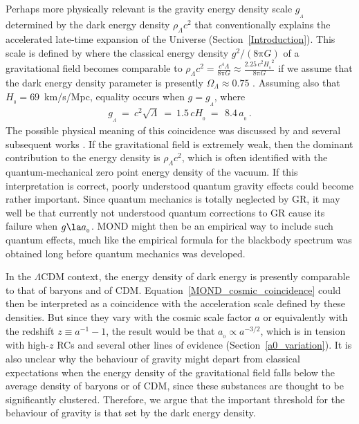 \documentclass[fleqn,usenatbib,useAMS]{mnras} %
\begin{document}
Perhaps more physically relevant is the gravity energy density scale $g_{_\Lambda}$ determined by the dark energy density $\rho_{\Lambda} c^2$ that conventionally explains the accelerated late-time expansion of the Universe (Section~\ref{Introduction}). This scale is defined by where the classical energy density $g^2/\left(8 \mathrm{\pi} G \right)$ of a gravitational field \citep[equation~9 of][]{Peters_1981} becomes comparable to $\rho_{\Lambda} c^2 = \frac{c^4 \Lambda}{8 \mathrm{\pi} G} \approx \frac{2.25 \, c^2 {H_{_0}}^2}{8 \mathrm{\pi} G}$ if we assume that the dark energy density parameter is presently $\Omega_\Lambda \approx 0.75$ \citep{Planck_2016, Planck_2020}. Assuming also that $H_{_0} = 69$~km/s/Mpc, equality occurs when $g = g_{_\Lambda}$, where
\begin{eqnarray}
	g_{_\Lambda} ~=~ c^2 \sqrt{\Lambda} ~=~ 1.5 \, cH_{_0} ~=~ \, 8.4 \, a_{_0} \, .
	\label{MOND_cosmic_coincidence}
\end{eqnarray}
The possible physical meaning of this coincidence was discussed by \citet{Milgrom_1999} and several subsequent works \citep[e.g.][]{Pazy_2013, Verlinde_2017, Smolin_2017}. If the gravitational field is extremely weak, then the dominant contribution to the energy density is $\rho_{\Lambda}c^2$, which is often identified with the quantum-mechanical zero point energy density of the vacuum. If this interpretation is correct, poorly understood quantum gravity effects could become rather important. Since quantum mechanics is totally neglected by GR, it may well be that currently not understood quantum corrections to GR cause its failure when $g \la a_{_0}$. MOND might then be an empirical way to include such quantum effects, much like the empirical formula for the blackbody spectrum was obtained long before quantum mechanics was developed.

In the $\Lambda$CDM context, the energy density of dark energy is presently comparable to that of baryons and of CDM. Equation~\ref{MOND_cosmic_coincidence} could then be interpreted as a coincidence with the acceleration scale defined by these densities. But since they vary with the cosmic scale factor $a$ or equivalently with the redshift $z \equiv a^{-1} - 1$, the result would be that $a_{_0} \propto a^{-3/2}$, which is in tension with high-$z$ RCs \citep{Milgrom_2017} and several other lines of evidence (Section~\ref{a0_variation}). It is also unclear why the behaviour of gravity might depart from classical expectations when the energy density of the gravitational field falls below the average density of baryons or of CDM, since these substances are thought to be significantly clustered. Therefore, we argue that the important threshold for the behaviour of gravity is that set by the dark energy density.
\end{document}
